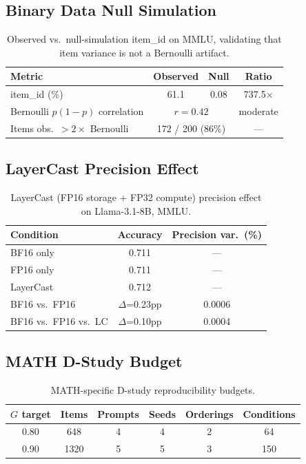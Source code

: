 \documentclass[11pt,a4paper]{article}
\newcommand{\Gcoeff}{\ensuremath{G}}
\begin{document}
\subsection{Binary Data Null Simulation}

\begin{table}[h]
\centering
\caption{Observed vs.\ null-simulation item\_id on MMLU, validating that item variance is not a Bernoulli artifact.}
\label{tab:nullsim}
\small
\begin{tabular}{lccc}
\toprule
\textbf{Metric} & \textbf{Observed} & \textbf{Null} & \textbf{Ratio} \\
\midrule
item\_id (\%)                    & 61.1  & 0.08 & 737.5$\times$ \\
Bernoulli $p(1{-}p)$ correlation & \multicolumn{2}{c}{$r=0.42$} & moderate \\
Items obs.\ $> 2\times$ Bernoulli & \multicolumn{2}{c}{172 / 200 (86\%)} & --- \\
\bottomrule
\end{tabular}
\end{table}

\subsection{LayerCast Precision Effect}

\begin{table}[h]
\centering
\caption{LayerCast (FP16 storage + FP32 compute) precision effect on Llama-3.1-8B, MMLU.}
\label{tab:layercast}
\small
\begin{tabular}{lcc}
\toprule
\textbf{Condition} & \textbf{Accuracy} & \textbf{Precision var.\ (\%)} \\
\midrule
BF16 only    & 0.711 & --- \\
FP16 only    & 0.711 & --- \\
LayerCast    & 0.712 & --- \\
BF16 vs.\ FP16         & $\Delta$=0.23pp  & 0.0006 \\
BF16 vs.\ FP16 vs.\ LC & $\Delta$=0.10pp  & 0.0004 \\
\bottomrule
\end{tabular}
\end{table}

\subsection{MATH D-Study Budget}

\begin{table}[h]
\centering
\caption{MATH-specific D-study reproducibility budgets.}
\label{tab:math-dstudy}
\small
\begin{tabular}{cccccc}
\toprule
\textbf{$\Gcoeff$ target} & \textbf{Items} & \textbf{Prompts} & \textbf{Seeds} & \textbf{Orderings} & \textbf{Conditions} \\
\midrule
0.80 & 648  & 4 & 4 & 2 & 64 \\
0.90 & 1320 & 5 & 5 & 3 & 150 \\
\bottomrule
\end{tabular}
\end{table}
\end{document}
